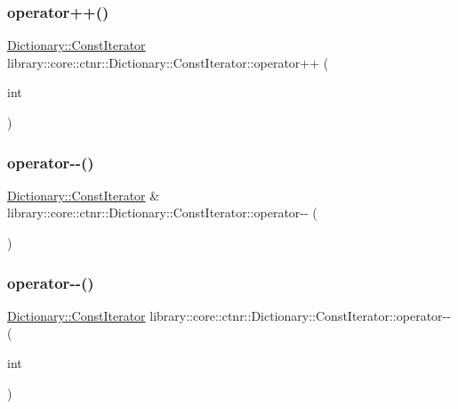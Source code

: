 \subsubsection{\texorpdfstring{operator++()}{operator++()}\hspace{0.1cm}{\footnotesize\ttfamily [2/2]}}
{\footnotesize\ttfamily \mbox{\hyperlink{classlibrary_1_1core_1_1ctnr_1_1_dictionary_1_1_const_iterator}{Dictionary\+::\+Const\+Iterator}} library\+::core\+::ctnr\+::\+Dictionary\+::\+Const\+Iterator\+::operator++ (\begin{DoxyParamCaption}\item[{int}]{ }\end{DoxyParamCaption})}

\mbox{\label{classlibrary_1_1core_1_1ctnr_1_1_dictionary_1_1_const_iterator_a15d3a4fcd2012eada35d1fffa415ddb0}} 
\subsubsection{\texorpdfstring{operator-\/-\/()}{operator--()}\hspace{0.1cm}{\footnotesize\ttfamily [1/2]}}
{\footnotesize\ttfamily \mbox{\hyperlink{classlibrary_1_1core_1_1ctnr_1_1_dictionary_1_1_const_iterator}{Dictionary\+::\+Const\+Iterator}} \& library\+::core\+::ctnr\+::\+Dictionary\+::\+Const\+Iterator\+::operator-\/-\/ (\begin{DoxyParamCaption}{ }\end{DoxyParamCaption})}

\mbox{\label{classlibrary_1_1core_1_1ctnr_1_1_dictionary_1_1_const_iterator_a1c129ab2071c6b9fd833552d1bebb0f6}} 
\subsubsection{\texorpdfstring{operator-\/-\/()}{operator--()}\hspace{0.1cm}{\footnotesize\ttfamily [2/2]}}
{\footnotesize\ttfamily \mbox{\hyperlink{classlibrary_1_1core_1_1ctnr_1_1_dictionary_1_1_const_iterator}{Dictionary\+::\+Const\+Iterator}} library\+::core\+::ctnr\+::\+Dictionary\+::\+Const\+Iterator\+::operator-\/-\/ (\begin{DoxyParamCaption}\item[{int}]{ }\end{DoxyParamCaption})}

